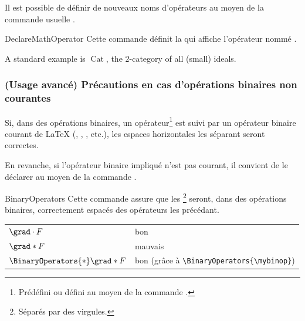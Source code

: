 \documentclass[french,nolocaltoc]{nwejmart}
\newtheorem[style=definition]{fait}
\newtheorem[title=contraventionnalisation]{ctrv}
\newtheorem[title-plural=anneaux]{anneau}
\newtheorem[title-plural=idéaux]{idéal}
\DeclareMathOperator{\cat}{Cat}
\newcommand{\mybinop}{\mathbin{*}}
\begin{document}
Il est possible de définir de nouveaux noms d'opérateurs au moyen de la commande
usuelle .

\begin{docCommand}{DeclareMathOperator}{}
  Cette commande définit la  qui affiche l'opérateur nommé
  .
\end{docCommand}

\begin{preamblecode}
\DeclareMathOperator{\cat}{Cat}
\end{preamblecode}
\begin{bodycode}[listing and text,listing options={deletekeywords={example},deletekeywords={[4]all}}]
A standard example is $\cat$, the $2$-category of all (small) ideals.
\end{bodycode}

\subsubsection{(Usage avancé) Précautions en cas d'opérations binaires non
  courantes}

Si, dans des opérations binaires, un opérateur\footnote{Prédéfini ou défini au
  moyen de la commande \protect{}.} est suivi par un
opérateur binaire courant de \LaTeX{} (,
, , etc.), les espaces horizontales les
séparant seront correctes.

En revanche, si l'opérateur binaire impliqué n'est pas courant, il convient de
le déclarer au moyen de la commande .

\begin{docCommand}{BinaryOperators}{}
  Cette commande assure que les \footnote{Séparés par
    des virgules.} seront, dans des opérations binaires, correctement espacés
  des opérateurs les précédant.
\end{docCommand}

\begin{preamblecode}[listing options={moretexcs={mybinop}}]
\newcommand{\mybinop}{\mathbin{*}}
\end{preamblecode}
\begin{bodycode}[listing and text,listing options={moretexcs={mybinop}}]
\begin{tabular}{>{$}l<{$}@{ : }l}
  \grad \cdot    F & bon     \\
  \grad \mybinop F & mauvais \\ \BinaryOperators{\mybinop}%
  \grad \mybinop F & bon (grâce à \verb+\BinaryOperators{\mybinop}+)
\end{tabular}
\end{bodycode}
\end{document}
